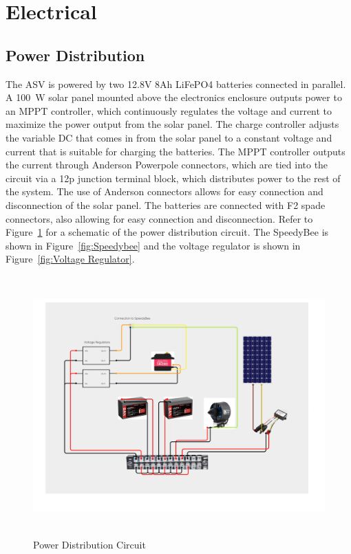\section{Electrical}

\subsection{Power Distribution}
The ASV is powered by two 12.8V 8Ah LiFePO4 batteries connected in parallel. A \SI{100}{\watt} solar panel mounted above the electronics enclosure outputs power to an MPPT controller, which continuously regulates the voltage and current to maximize the power output from the solar panel. The charge controller adjusts the variable DC that comes in from the solar panel to a constant voltage and current that is suitable for charging the batteries. The MPPT controller outputs the current through Anderson Powerpole connectors, which are tied into the circuit via a 12p junction terminal block, which distributes power to the rest of the system. The use of Anderson connectors allows for easy connection and disconnection of the solar panel. The batteries are connected with F2 spade connectors, also allowing for easy connection and disconnection. Refer to Figure~\ref{fig:Power_Diagram} for a schematic of the power distribution circuit. The SpeedyBee is shown in Figure~\ref{fig:Speedybee} and the voltage regulator is shown in Figure~\ref{fig:Voltage Regulator}.

\begin{figure}[H]
    \centering
    \includegraphics[height=10cm]{Power_Diagram.png}
    \caption{Power Distribution Circuit}
    \label{fig:Power_Diagram}
\end{figure}

